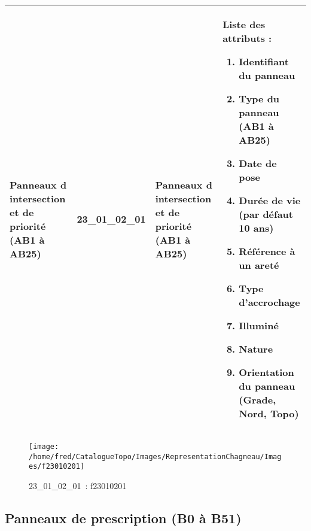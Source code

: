 \documentclass[12pt,titlepage]{book}
\begin{document}
\renewcommand{\arraystretch}{1.2}
\begin{supertabular}{|p{10cm}|c|p{13cm}|p{12cm}|}
 Panneaux d intersection et de priorité (AB1 à AB25) & 23\_01\_02\_01 & Panneaux d intersection et de priorité (AB1 à AB25) & Liste des attributs :
\begin{enumerate}
  \item Identifiant du panneau  \item Type du panneau (AB1 à AB25)  \item Date de pose  \item Durée de vie (par défaut 10 ans)  \item Référence à un areté  \item Type d'accrochage  \item Illuminé  \item Nature  \item Orientation du panneau (Grade, Nord, Topo)\end{enumerate}
\\
\hline
\end{supertabular}
\begin{figure}[h!]
  \hfill         %
  \begin{minipage}[t]{3cm}
    \begin{center}
      \texttt{[image: /home/fred/CatalogueTopo/Images/RepresentationChagneau/Images/f23010201]}
      \caption[~23\_01\_02\_01]{\small{23\_01\_02\_01~:} \tiny{f23010201}}\label{f23010201}
    \end{center}
  \end{minipage}
\end{figure}


\subsection{Panneaux de prescription (B0 à B51)}
\noindent
\vspace{\baselineskip}
\end{document}
